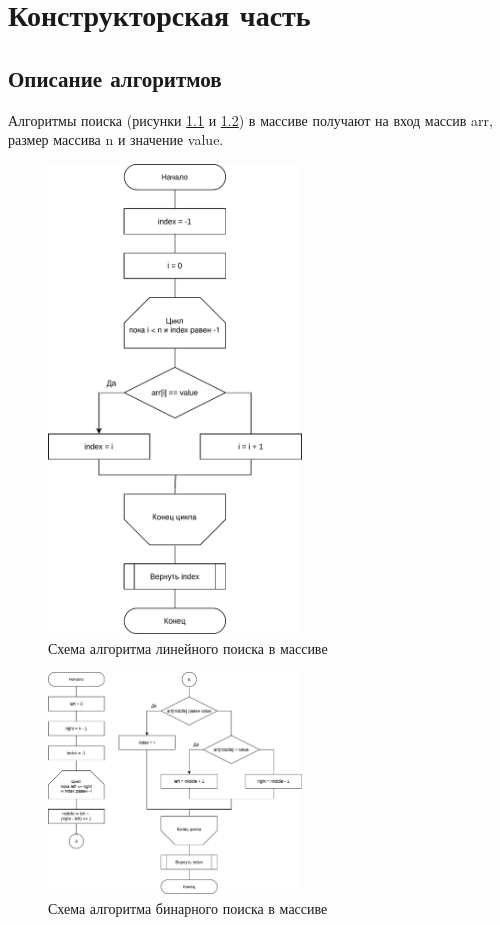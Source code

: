 \chapter{Конструкторская часть}

\section{Описание алгоритмов}

Алгоритмы поиска (рисунки \ref{fig:lin} и \ref{fig:bin}) в массиве получают на вход массив arr, размер массива n и значение value.

\begin{figure}[h!]
	\centering
	\includegraphics[width=0.6\textwidth]{tex_parts/linear.pdf}
	\caption{\label{fig:lin}Схема алгоритма линейного поиска в массиве}
\end{figure}

\begin{figure}[h!]
	\centering
	\includegraphics[width=0.6\textwidth]{tex_parts/binary.pdf}
	\caption{\label{fig:bin}Схема алгоритма бинарного поиска в массиве}
\end{figure}

